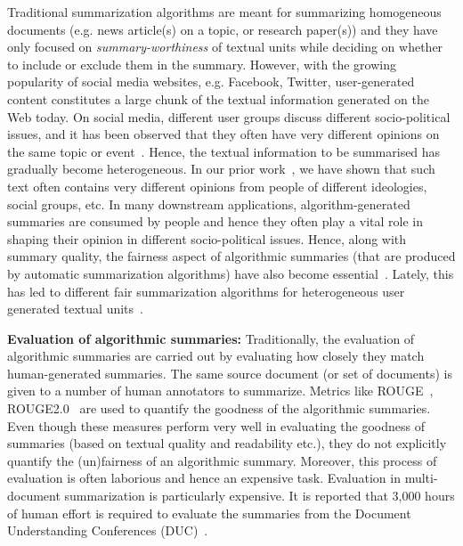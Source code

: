Traditional summarization algorithms are meant for summarizing homogeneous documents (e.g. %
news article(s) on a topic, or research paper(s)) and they have only focused on {\it summary-worthiness} of textual units while deciding on whether to include or exclude them in the summary. However, with the  growing popularity of social media websites, e.g. Facebook, Twitter, user-generated content constitutes a large chunk of the textual information generated on the Web today. On social media, different user groups discuss different socio-political issues, and it has been observed that they often have very different opinions on the same topic or event~\cite{dash2019summarizing,mukherjee2020read}. 
Hence, the textual information to be summarised has gradually become heterogeneous. 
In our prior work~\cite{dash2019summarizing}, we have shown that such text often contains very different opinions from people of different ideologies, social groups, etc. In many downstream applications, algorithm-generated summaries are consumed by people and hence they often play a vital role in shaping their opinion in different socio-political issues. Hence, along with summary quality, the fairness aspect of algorithmic summaries (that are produced by automatic summarization algorithms) have also become essential~\cite{shandilya2018fairness, dash2019summarizing}. Lately, this has led to different fair summarization algorithms for heterogeneous user generated textual units~\cite{dash2019summarizing, mukherjee2020read}.

\vspace{1 mm}
\noindent
\textbf{Evaluation of algorithmic summaries:} 
Traditionally, the evaluation of algorithmic summaries are carried out by evaluating how closely they match human-generated summaries.
The same source document (or set of documents) is given to a number of human annotators to summarize. Metrics like ROUGE~\cite{lin2004rouge}, ROUGE2.0~\cite{ganesan2015rouge}
are used to quantify the goodness of the algorithmic summaries. Even though these measures perform very well in evaluating the goodness of summaries (based on textual quality and readability etc.), they do not explicitly quantify the (un)fairness of an algorithmic summary. 
Moreover, this process of evaluation is often laborious and hence an expensive task. %
Evaluation in multi-document summarization is particularly expensive. It is reported that 3,000 hours of human effort is required to evaluate the summaries from the Document Understanding Conferences (DUC)~\cite{lin2004rouge}.  

